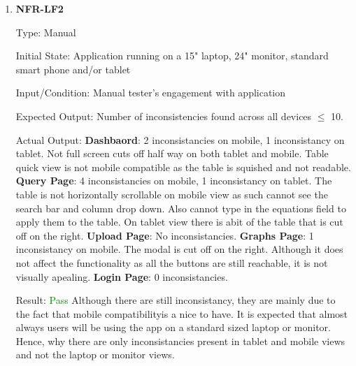 \documentclass[12pt, titlepage]{article}
\begin{document}
\begin{enumerate}
\item{\textbf{NFR-LF2}} \label{NFR:LF2}

Type: Manual

Initial State: Application running on a 15" laptop, 24" monitor, standard smart
phone and/or tablet

Input/Condition: Manual tester's engagement with application

Expected Output: Number of inconsistencies found across all devices $\leq$ 10.

Actual Output: \newline
\textbf{Dashbaord}: 2 inconsistancies on mobile, 1 inconsistancy on tablet. Not
full screen cuts off half way on both tablet and mobile. Table quick view is not
mobile compatible as the table is squished and not readable.\newline
\textbf{Query Page}: 4 inconsistancies on mobile, 1 inconsistancy on tablet. The
table is not horizontally scrollable on mobile view as such cannot see the
search bar and column drop down. Also cannot type in the equations field to
apply them to the table. On tablet view there is abit of the table that is cut
off on the right. \newline
\textbf{Upload Page}: No inconsistancies.\newline
\textbf{Graphs Page}: 1 inconsistancy on mobile. The modal is cut off on the
right. Although it does not affect the functionality as all the buttons are
still reachable, it is not visually apealing. \newline
\textbf{Login Page}: 0 inconsistancies.

Result: \textcolor{green}{Pass} \newline
Although there are still inconsistancy, they are mainly due to the fact that
mobile compatibilityis a nice to have. It is expected that almost always users
will be using the app on a standard sized laptop or monitor. Hence, why there
are only inconsistancies present in tablet and mobile views and not the laptop
or monitor views. \end{enumerate}
\end{document}
